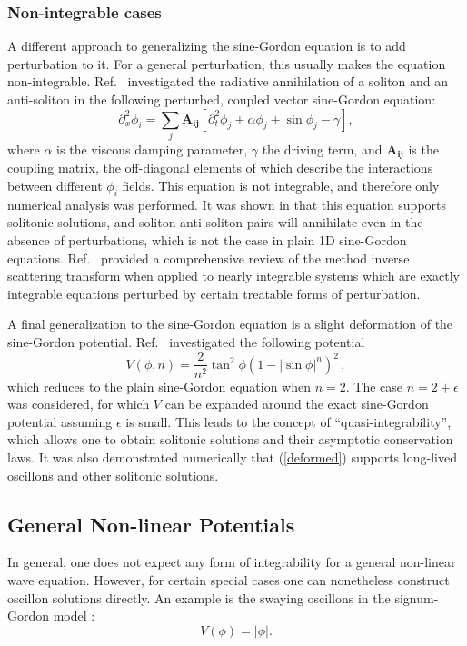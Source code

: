 \documentclass[11pt]{book}
\begin{document}
\subsubsection{Non-integrable cases}
A different approach to generalizing the sine-Gordon equation is to add perturbation to it. For a general perturbation, this usually makes the equation non-integrable. Ref.~\cite{PhysRevB.85.134525} investigated the radiative annihilation of a soliton and an anti-soliton in the following perturbed, coupled vector sine-Gordon equation:
\begin{equation}
  \partial^2_x\phi_i=\sum_j \mathbf{A_{ij}} \left[\partial^2_t \phi_j +\alpha \phi_j +\sin \phi_j - \gamma\right],
\end{equation}
where $\alpha$ is the viscous damping parameter, $\gamma$ the driving term, and $\mathbf{A_{ij}}$ is the coupling matrix, the off-diagonal elements of which describe the interactions between different $\phi_i$ fields. This equation is not integrable, and therefore only numerical analysis was performed. It was shown in \cite{PhysRevB.85.134525} that this equation supports solitonic solutions, and soliton-anti-soliton pairs will annihilate even in the absence of perturbations, which is not the case in plain 1D sine-Gordon equations.  Ref.~\cite{RevModPhys.61.763} provided a comprehensive review of the method inverse scattering transform when applied to nearly integrable systems which are exactly integrable equations perturbed by certain treatable forms of perturbation.

\medbreak

A final generalization to the sine-Gordon equation is a slight deformation of the sine-Gordon potential. Ref.~\cite{Ferreira2011} investigated the following potential
\begin{equation}\label{deformed}
  V(\phi, n) = \frac{2}{n^2} \tan^2 \phi \left( 1 - \left|\sin\phi\right|^n \right)^2\,,
\end{equation}
which reduces to the plain sine-Gordon equation when $n=2$. The case $n=2+\epsilon$ was considered, for which $V$ can be expanded around the exact sine-Gordon potential assuming $\epsilon$ is small. This leads to the concept of ``quasi-integrability'', which allows one to obtain solitonic solutions and their asymptotic conservation laws. It was also demonstrated numerically that (\ref{deformed}) supports long-lived oscillons and other solitonic solutions.

\subsection{General Non-linear Potentials}
In general, one does not expect any form of integrability for a general non-linear wave equation. However, for certain special cases one can nonetheless construct oscillon solutions directly. An example is the swaying oscillons in the signum-Gordon model \cite{Arodz:2011zm}:
\begin{equation}
  V(\phi)=\left|\phi\right|.
\end{equation}
\end{document}
